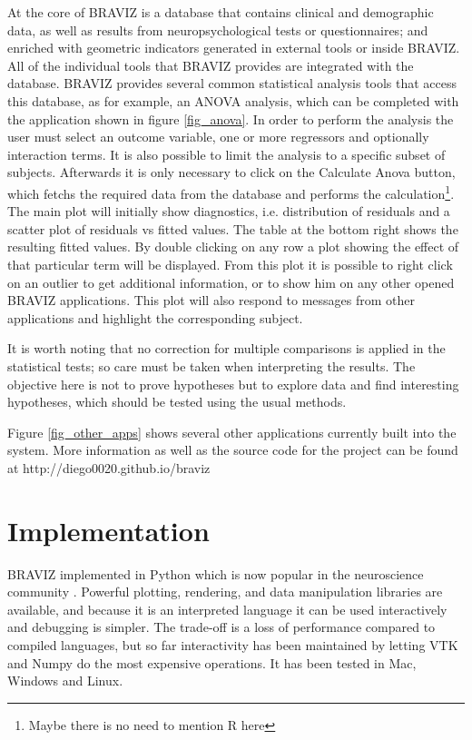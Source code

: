 \documentclass[utf8]{frontiersSCNS} %
\begin{document}
At the core of BRAVIZ is a database that contains clinical and demographic data, as well as results from neuropsychological tests or questionnaires; and enriched with geometric indicators generated in external tools or inside BRAVIZ. All of the individual tools that BRAVIZ provides are integrated with the database. BRAVIZ provides several common statistical analysis tools that access this database, as for example, an ANOVA  analysis, which can be completed with the application shown in figure \ref{fig_anova}. In order to perform the analysis the user must select an outcome variable, one or more regressors and optionally interaction terms. It is also possible to limit the analysis to a specific subset of subjects. Afterwards it is only necessary to click on the Calculate Anova button, which fetchs the required data from the database and performs the calculation\footnote{Maybe there is no need to mention R here}. The main plot will initially show diagnostics, i.e. distribution of residuals and a scatter plot of residuals vs fitted values. The table at the bottom right shows the resulting fitted values. By double clicking on any row a plot showing the effect of that particular term will be displayed. From this plot it is possible to right click on an outlier to get additional information, or to show him on any other opened BRAVIZ applications. This plot will also respond to messages from other applications and highlight the corresponding subject.

It is worth noting that no correction for multiple comparisons is applied in the statistical tests; so care must be taken when interpreting the results. The objective here is not to prove hypotheses but to explore data and find interesting hypotheses, which should be tested using the usual methods.

Figure \ref{fig_other_apps} shows several other applications currently built into the system. More information as well as the source code for the project can be found at http://diego0020.github.io/braviz


\section{Implementation}

BRAVIZ implemented in Python which is now popular in the neuroscience community \citep{gorgolewski_nipype:_2011, garyfallidis_dipy_2014}.  Powerful plotting, rendering, and data manipulation libraries are available, and because it is an interpreted language it can be used interactively and debugging is simpler. The trade-off is a loss of performance compared to compiled languages, but so far interactivity has been maintained by letting VTK\citep{schroeder_vtk_1998} and Numpy\citep{van_der_walt_numpy_2011} do the most expensive operations. It has been tested in Mac, Windows and Linux.
\end{document}
